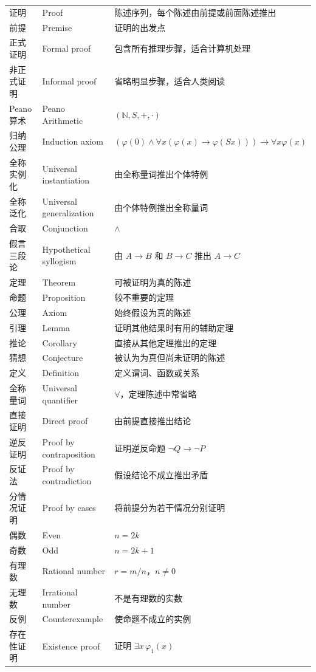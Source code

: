\documentclass[UTF8,11pt,a4paper]{ctexbook}   %
\theoremstyle{definition}
\begin{document}
\begin{longtable}{|p{4.8cm}|p{4.8cm}|p{4.8cm}|}
证明 & Proof & 陈述序列，每个陈述由前提或前面陈述推出 \\
前提 & Premise & 证明的出发点 \\
正式证明 & Formal proof & 包含所有推理步骤，适合计算机处理 \\
非正式证明 & Informal proof & 省略明显步骤，适合人类阅读 \\
Peano算术 & Peano Arithmetic & $(\mathbb{N}, S, +, \cdot)$ \\
归纳公理 & Induction axiom & $(\varphi(0)\land\forall x(\varphi(x)\to\varphi(Sx)))\to\forall x\varphi(x)$ \\
全称实例化 & Universal instantiation & 由全称量词推出个体特例 \\
全称泛化 & Universal generalization & 由个体特例推出全称量词 \\
合取 & Conjunction & $\land$ \\
假言三段论 & Hypothetical syllogism & 由 $A\to B$ 和 $B\to C$ 推出 $A\to C$ \\
定理 & Theorem & 可被证明为真的陈述 \\
命题 & Proposition & 较不重要的定理 \\
公理 & Axiom & 始终假设为真的陈述 \\
引理 & Lemma & 证明其他结果时有用的辅助定理 \\
推论 & Corollary & 直接从其他定理推出的定理 \\
猜想 & Conjecture & 被认为为真但尚未证明的陈述 \\
定义 & Definition & 定义谓词、函数或关系 \\
全称量词 & Universal quantifier & $\forall$，定理陈述中常省略 \\
直接证明 & Direct proof & 由前提直接推出结论 \\
逆反证明 & Proof by contraposition & 证明逆反命题 $\neg Q\to\neg P$ \\
反证法 & Proof by contradiction & 假设结论不成立推出矛盾 \\
分情况证明 & Proof by cases & 将前提分为若干情况分别证明 \\
偶数 & Even & $n=2k$ \\
奇数 & Odd & $n=2k+1$ \\
有理数 & Rational number & $r=m/n$，$n\neq 0$ \\
无理数 & Irrational number & 不是有理数的实数 \\
反例 & Counterexample & 使命题不成立的实例 \\
\hline
存在性证明 & Existence proof & 证明 $\exists x\,\varphi_1(x)$ \\

\end{longtable}
\end{document}

